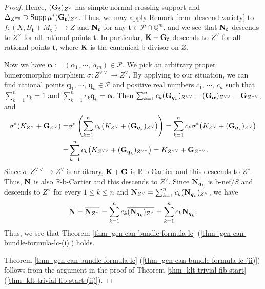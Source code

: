 \documentclass[12pt]{amsart}
\theoremstyle{definition}
\begin{document}
\begin{proof}
Hence, $(\boldsymbol{\rm G}_{\boldsymbol{t}})_{Z^{\vee}}$ has simple normal crossing support and $\Delta_{Z^{\rm ws}} \supset {\rm Supp}\,\mu^{*}(\boldsymbol{\rm G}_{\boldsymbol{t}})_{Z^{\vee}}$. 
Thus, we may apply Remark \ref{rem--descend-variety} to $f \colon (X, B_{\boldsymbol{t}}+M_{\boldsymbol{t}}) \to Z$ and $\boldsymbol{\rm N}_{\boldsymbol{t}}$ for any $\boldsymbol{t} \in \mathcal{P} \cap {\mathbb{Q}}^{m}$, and we see that $\boldsymbol{\rm N}_{\boldsymbol{t}}$ descends to $Z^{\vee}$ for all rational points $\boldsymbol{t}$. 
In particular, $\boldsymbol{\rm K}+\boldsymbol{\rm G}_{\boldsymbol{t}}$ descends to $Z^{\vee}$ for all rational points $\boldsymbol{t}$, where $\boldsymbol{\rm K}$ is the canonical b-divisor on $Z$.  

Now we have $\boldsymbol{\alpha}:=(\alpha_{1},\,\cdots,\,\alpha_{m}) \in \mathcal{P}$. 
We pick an arbitrary proper bimeromorphic morphism $\sigma \colon Z^{\vee\vee} \to Z^{\vee}$. 
By applying \cite[Proof of Lemma 5.5]{fujino-hashizume-adjunction} to our situation, we can find rational points $\boldsymbol{q}_{1},\,\cdots,\,\boldsymbol{q}_{n} \in \mathcal{P}$ and positive real numbers $c_{1},\, \cdots,\, c_{n}$ such that $\sum_{k=1}^{n}c_{k}=1$ and $\sum_{k=1}^{n}c_{k}\boldsymbol{q}_{k}=\boldsymbol{\alpha}$. 
Then $\sum_{k=1}^{n}c_{k}(\boldsymbol{\rm G}_{\boldsymbol{q}_{k}})_{Z^{\vee\vee}}=(\boldsymbol{\rm G}_{\boldsymbol{\alpha}})_{Z^{\vee\vee}}=\boldsymbol{\rm G}_{Z^{\vee\vee}}$, and
\begin{equation*}
\begin{split}
\sigma^{*}(K_{Z^{\vee}}+\boldsymbol{\rm G}_{Z^{\vee}})=&\sigma^{*}\left(\sum_{k=1}^{n}c_{k}\bigl(K_{Z^{\vee}}+(\boldsymbol{\rm G}_{\boldsymbol{q}_{k}})_{Z^{\vee}}\bigr)\right)=\sum_{k=1}^{n}c_{k}\sigma^{*}\bigl(K_{Z^{\vee}}+(\boldsymbol{\rm G}_{\boldsymbol{q}_{k}})_{Z^{\vee}}\bigr)\\
=&\sum_{k=1}^{n}c_{k}\bigl(K_{Z^{\vee\vee}}+(\boldsymbol{\rm G}_{\boldsymbol{q}_{k}})_{Z^{\vee\vee}}\bigr)=K_{Z^{\vee\vee}}+\boldsymbol{\rm G}_{Z^{\vee\vee}}. 
\end{split}
\end{equation*}
Since $\sigma \colon Z^{\vee\vee} \to Z^{\vee}$ is arbitrary, $\boldsymbol{\rm K}+\boldsymbol{\rm G}$ is $\mathbb{R}$-b-Cartier and this descends to $Z^{\vee}$. 
Thus, $\boldsymbol{\rm N}$ is also $\mathbb{R}$-b-Cartier and this descends to $Z^{\vee}$. 
Since $\boldsymbol{\rm N}_{\boldsymbol{q}_{k}}$ is b-nef$/S$ and descends to $Z^{\vee}$ for every $1\leq k \leq n$ and $\boldsymbol{\rm N}_{Z^{\vee}}=\sum_{k=1}^{n}c_{k}(\boldsymbol{\rm N}_{\boldsymbol{q}_{k}})_{Z^{\vee}}$, we have 
$$\boldsymbol{\rm N}=\overline{\boldsymbol{\rm N}_{Z^{\vee}}}=\sum_{k=1}^{n}c_{k}\overline{(\boldsymbol{\rm N}_{\boldsymbol{q}_{k}})_{Z^{\vee}}}=\sum_{k=1}^{n}c_{k}\boldsymbol{\rm N}_{\boldsymbol{q}_{k}}.$$ 
Thus, we see that Theorem \ref{thm--gen-can-bundle-formula-lc} (\ref{thm--gen-can-bundle-formula-lc-(i)}) holds. 

Theorem \ref{thm--gen-can-bundle-formula-lc} (\ref{thm--gen-can-bundle-formula-lc-(ii)}) follows from the argument in the proof of Theorem \ref{thm--klt-trivial-fib-start} (\ref{thm--klt-trivial-fib-start-(ii)}). 
\end{proof}
\end{document}
